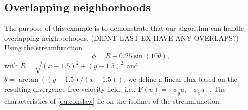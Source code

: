 {\large
\begin{table}
\centering
{}
\quad
{}

\caption{Errors for the linear convergence study. ADD METHOD DETAILS TO
DESCRIPTION - USED WHICH GRADIENT RECON. ADD 400 POINTS}
\end{table}
}

\subsection{Overlapping neighborhoods}
The purpose of this example is to demonstrate that our algorithm can handle 
overlapping neighborhoods. (DIDNT LAST EX HAVE ANY OVERLAPS?)  
Using the streamfunction
$$
\phi = R - 0.25\sin(10\theta),
$$
with $R = \sqrt{(x-1.5)^2+(y-1.5)^2}$ and $\theta = \arctan((y-1.5)/(x-1.5))$, we define a linear flux based on the resulting divergence free velocity field, i.e.,  $\mathbf{F}(u) = [\phi_y u, -\phi_xu]$.  The characteristics of \eqref{eq:conslaw} lie on the isolines of the streamfunction.

